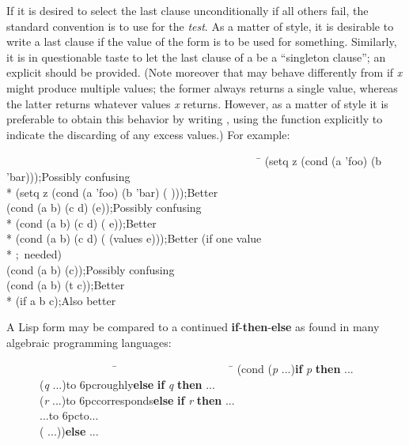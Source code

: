 \begin{defmac}
If it is desired to select the last clause unconditionally if all others
fail, the standard convention is to use {\true} for the \textit{test}.
As a matter of style, it is desirable to write a last clause
\cd{({\true} {\false})} if the value of the  form is to be used
for something.  Similarly, it is in questionable
taste to let the last clause of
a  be a ``singleton clause''; an explicit {\true} should be provided.
(Note moreover that  may behave differently from
 if \textit{x} might produce multiple values;
the former always returns a single value, whereas the latter returns whatever
values \textit{x} returns.  However, as a matter of style it is preferable
to obtain this behavior by writing ,
using the  function explicitly to indicate the discarding
of any excess values.)
For example:
\begin{lisp}
~~~~~~~~~~~~~~~~~~~~~~~~~~~~~~~~~~~~~~~~~~~~~~\=\kill
(setq z (cond (a 'foo) (b 'bar)))\>;{\rm Possibly confusing} \\*
(setq z (cond (a 'foo) (b 'bar) ({\true} {\false})))\>;{\rm Better} \\
(cond (a b) (c d) (e))\>;{\rm Possibly confusing} \\*
(cond (a b) (c d) ({\true} e))\>;{\rm Better} \\*
(cond (a b) (c d) ({\true} (values e)))\>;{\rm Better (if one value} \\*
                                       \>;~{\rm needed)} \\
(cond (a b) (c))\>;{\rm Possibly confusing} \\
(cond (a b) (t c))\>;{\rm Better} \\*
(if a b c)\>;{\rm Also better}
\end{lisp}
A Lisp  form may be compared to a continued \textbf{if}-\textbf{then}-\textbf{else}
as found in many algebraic programming languages:
\begin{lisp}
~~~~~~~~~~~~~~~~~~~~\=~~~~~~~~~~~~~~~~~~~~~\=\kill
(cond (\textit{p} ...)\>\>\textbf{if} \textit{p} \textbf{then} ... \\
~~~~~~(\textit{q} ...)\>\hbox to 6pc{\hss\rm roughly\hss}\>\textbf{else} \textbf{if} \textit{q} \textbf{then} ... \\
~~~~~~(\textit{r} ...)\>\hbox to 6pc{\hss\rm corresponds\hss}\>\textbf{else} \textbf{if} \textit{r} \textbf{then} ... \\
~~~~~~...\>\hbox to 6pc{\hss\rm to\hss}\>... \\
~~~~~~({\true} ...))\>\>\textbf{else} ...
\end{lisp}
\end{defmac}

